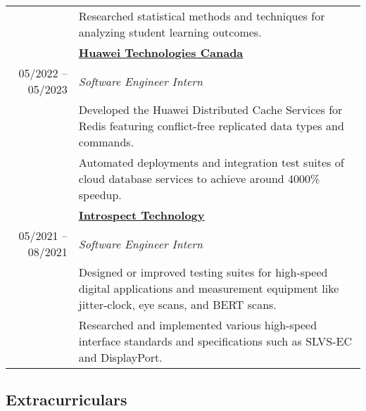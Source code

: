 \documentclass{article}
\begin{document}
\begin{tabularx}{\textwidth}{r X}
		& {\small Researched statistical methods and techniques for analyzing student learning outcomes.} \\
		\addlinespace
		& \textbf{\href{https://www.huawei.com/ca/}{Huawei Technologies Canada}} \\*
		05/2022 -- 05/2023 & \textit{Software Engineer Intern} \\*
		& {\small Developed the Huawei Distributed Cache Services for Redis featuring conflict-free replicated data types and commands.} \\*
		& {\small Automated deployments and integration test suites of cloud database services to achieve around 4000\% speedup.} \\
		\addlinespace
		& \textbf{\href{https://introspect.ca/}{Introspect Technology}} \\*
		05/2021 -- 08/2021 & \textit{Software Engineer Intern} \\*
		& {\small Designed or improved testing suites for high-speed digital applications and measurement equipment like jitter-clock, eye scans, and BERT scans.} \\*
		& {\small Researched and implemented various high-speed interface standards and specifications such as SLVS-EC and DisplayPort.} \\*
	\end{tabularx}

	\subsection*{Extracurriculars}
\end{document}
